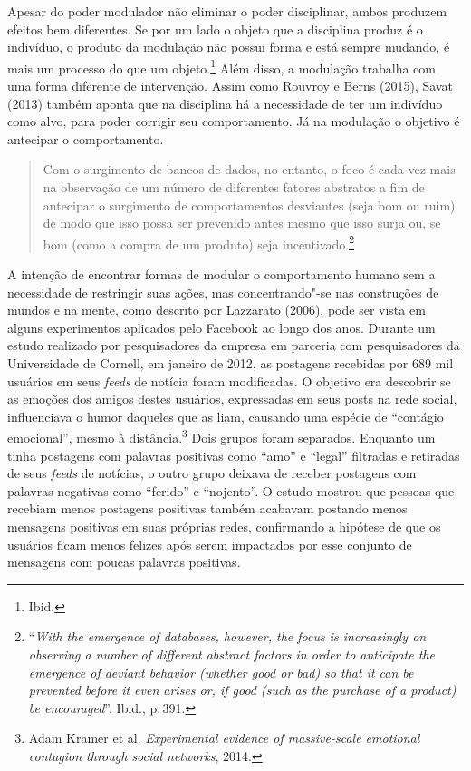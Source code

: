Apesar do poder modulador não eliminar o poder disciplinar, ambos
produzem efeitos bem diferentes. Se por um lado o objeto que a
disciplina produz é o indivíduo, o produto da modulação não possui forma
e está sempre mudando, é mais um processo do que um objeto.\footnote{Ibid.}
Além disso, a modulação trabalha com uma forma diferente de
intervenção. Assim como Rouvroy e Berns (2015), Savat (2013) também
aponta que na disciplina há a necessidade de ter um indivíduo como alvo,
para poder corrigir seu comportamento. Já na modulação o objetivo é
antecipar o comportamento.

\begin{quote}
Com o surgimento de bancos de dados, no entanto, o foco é cada vez mais
na observação de um número de diferentes fatores abstratos a fim de
antecipar o surgimento de comportamentos desviantes (seja bom ou ruim)
de modo que isso possa ser prevenido antes mesmo que isso surja ou, se
bom (como a compra de um produto) seja incentivado.\footnote{``\emph{With the
  emergence of databases, however, the focus is increasingly on
  observing a number of different abstract factors in order to
  anticipate the emergence of deviant behavior (whether good or bad) so
  that it can be prevented before it even arises or, if good (such as
  the purchase of a product) be encouraged}''. Ibid., p.\,391.}
\end{quote}

A intenção de encontrar formas de modular o comportamento humano sem a
necessidade de restringir suas ações, mas concentrando"-se nas
construções de mundos e na mente, como descrito por Lazzarato (2006),
pode ser vista em alguns experimentos aplicados pelo Facebook ao longo
dos anos. Durante um estudo realizado por pesquisadores da empresa em
parceria com pesquisadores da Universidade de Cornell, em janeiro de
2012, as postagens recebidas por 689 mil usuários em seus \emph{feeds} de notícia
foram modificadas. O objetivo era descobrir se as emoções dos amigos
destes usuários, expressadas em seus posts na rede social, influenciava
o humor daqueles que as liam, causando uma espécie de ``contágio
emocional'', mesmo à distância.\footnote{Adam Kramer et al. \emph{Experimental evidence of massive-scale emotional contagion through social networks}, 2014.} Dois
grupos foram separados. Enquanto um tinha postagens com palavras
positivas como ``amo'' e ``legal'' filtradas e retiradas de seus \emph{feeds}
de notícias, o outro grupo deixava de receber postagens com palavras negativas
como ``ferido'' e ``nojento''. O estudo mostrou que pessoas que recebiam
menos postagens positivas também acabavam postando menos mensagens
positivas em suas próprias redes, confirmando a hipótese de que os
usuários ficam menos felizes após serem impactados por esse conjunto de
mensagens com poucas palavras positivas.

